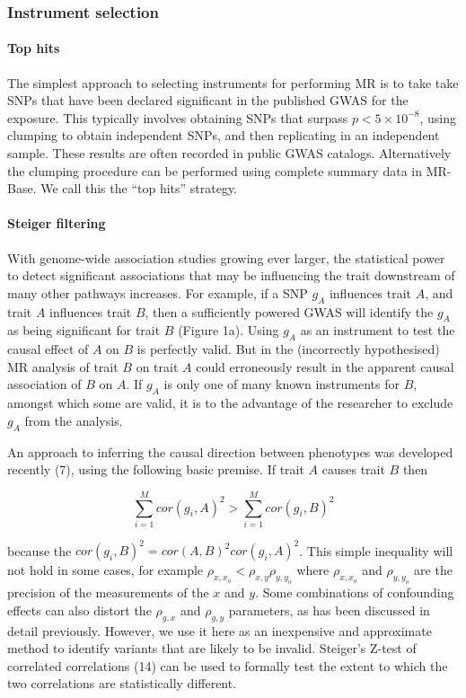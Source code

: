 \documentclass[]{article}
\let\oldparagraph\paragraph
\renewcommand{\paragraph}[1]{\oldparagraph{#1}\mbox{}}
\begin{document}
\subsubsection{Instrument selection}\label{instrument-selection}

\paragraph{Top hits}\label{top-hits}

The simplest approach to selecting instruments for performing MR is to
take take SNPs that have been declared significant in the published GWAS
for the exposure. This typically involves obtaining SNPs that surpass
\(p < 5 \times 10^{-8}\), using clumping to obtain independent SNPs, and
then replicating in an independent sample. These results are often
recorded in public GWAS catalogs. Alternatively the clumping procedure
can be performed using complete summary data in MR-Base. We call this
the ``top hits'' strategy.

\paragraph{Steiger filtering}\label{steiger-filtering}

With genome-wide association studies growing ever larger, the
statistical power to detect significant associations that may be
influencing the trait downstream of many other pathways increases. For
example, if a SNP \(g_{A}\) influences trait \(A\), and trait \(A\)
influences trait \(B\), then a sufficiently powered GWAS will identify
the \(g_{A}\) as being significant for trait \(B\) (Figure 1a). Using
\(g_{A}\) as an instrument to test the causal effect of \(A\) on \(B\)
is perfectly valid. But in the (incorrectly hypothesised) MR analysis of
trait \(B\) on trait \(A\) could erroneously result in the apparent
causal association of \(B\) on \(A\). If \(g_{A}\) is only one of many
known instruments for \(B\), amongst which some are valid, it is to the
advantage of the researcher to exclude \(g_{A}\) from the analysis.

An approach to inferring the causal direction between phenotypes was
developed recently (7), using the following basic premise. If trait
\(A\) causes trait \(B\) then

\[
\sum^M_{i=1}{cor(g_{i}, A)^2} > \sum^M_{i=1}{cor(g_{i}, B)^2}
\]

because the \(cor(g_{i}, B)^2 = cor(A, B)^{2} cor(g_{i}, A)^{2}\). This
simple inequality will not hold in some cases, for example
\(\rho_{x, x_o} < \rho_{x,y}\rho_{y,y_o}\) where \(\rho_{x, x_o}\) and
\(\rho_{y, y_o}\) are the precision of the measurements of the \(x\) and
\(y\). Some combinations of confounding effects can also distort the
\(\rho_{g,x}\) and \(\rho_{g,y}\) parameters, as has been discussed in
detail previously. However, we use it here as an inexpensive and
approximate method to identify variants that are likely to be invalid.
Steiger's Z-test of correlated correlations (14) can be used to formally
test the extent to which the two correlations are statistically
different.
\end{document}
